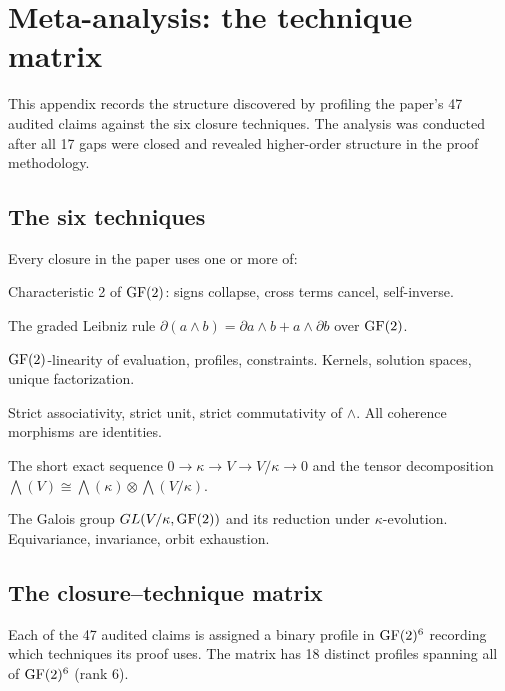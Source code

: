 \section{Meta-analysis: the technique matrix}\label{app:meta}

This appendix records the structure discovered by
profiling the paper's 47 audited claims against the
six closure techniques. The analysis was conducted
after all 17 gaps were closed and revealed higher-order
structure in the proof methodology.

\subsection{The six techniques}

Every closure in the paper uses one or more of:
\begin{description}[nosep,leftmargin=1.5cm]
  \item[T1: $1{+}1{=}0$] Characteristic 2 of $\operatorname{GF}(2)$:
    signs collapse, cross terms cancel, self-inverse.
  \item[T2: Leibniz] The graded Leibniz rule
    $\partial(a \wedge b) = \partial a \wedge b +
    a \wedge \partial b$ over $\operatorname{GF}(2)$.
  \item[T3: Linearity] $\operatorname{GF}(2)$-linearity of evaluation,
    profiles, constraints. Kernels, solution spaces,
    unique factorization.
  \item[T4: Strict $\wedge$] Strict associativity,
    strict unit, strict commutativity of $\wedge$.
    All coherence morphisms are identities.
  \item[T5: SES] The short exact sequence
    $0 \to \kappa \to V \to V/\kappa \to 0$ and the
    tensor decomposition
    $\bigwedge(V) \cong \bigwedge(\kappa) \otimes
    \bigwedge(V/\kappa)$.
  \item[T6: Galois] The Galois group
    $GL(V/\kappa, \operatorname{GF}(2))$ and its reduction under
    $\kappa$-evolution. Equivariance, invariance,
    orbit exhaustion.
\end{description}

\subsection{The closure--technique matrix}

Each of the 47 audited claims is assigned a binary
profile in $\operatorname{GF}(2)^6$ recording which techniques its
proof uses. The matrix has 18 distinct profiles spanning
all of $\operatorname{GF}(2)^6$ (rank 6).

